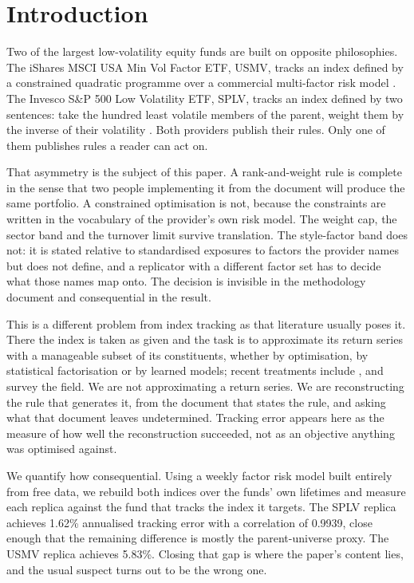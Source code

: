 \section{Introduction}
\label{sec:intro}
Two of the largest low-volatility equity funds are built on opposite
philosophies. The iShares MSCI USA Min Vol Factor ETF, USMV, tracks an index
defined by a constrained quadratic programme over a commercial multi-factor
risk model \citep{ishares2011usmv497k}. The Invesco S\&P 500 Low Volatility
ETF, SPLV, tracks an index defined by two sentences: take the hundred least
volatile members of the parent, weight them by the inverse of their volatility
\citep{invesco2024splv497k}. Both providers publish their rules. Only one of
them publishes rules a reader can act on.

That asymmetry is the subject of this paper. A rank-and-weight rule is complete
in the sense that two people implementing it from the document will produce the
same portfolio. A constrained optimisation is not, because the constraints are
written in the vocabulary of the provider's own risk model. The weight cap,
the sector band and the turnover limit survive translation. The style-factor
band does not: it is stated relative to standardised exposures to factors the
provider names but does not define, and a replicator with a different factor
set has to decide what those names map onto. The decision is invisible in the
methodology document and consequential in the result.

This is a different problem from index tracking as that literature usually
poses it. There the index is taken as given and the task is to approximate its
return series with a manageable subset of its constituents, whether by
optimisation, by statistical factorisation or by learned models; recent
treatments include \citet{cesarone2025benchmark}, and \citet{dhingra2026index}
survey the field. We are not approximating a return series. We are
reconstructing the rule that generates it, from the document that states the
rule, and asking what that document leaves undetermined. Tracking error appears
here as the measure of how well the reconstruction succeeded, not as an
objective anything was optimised against.

We quantify how consequential. Using a weekly factor risk model built entirely
from free data, we rebuild both indices over the funds' own lifetimes and
measure each replica against the fund that tracks the index it targets. The
SPLV replica achieves 1.62\% annualised tracking error with a correlation of
0.9939, close enough that the remaining difference is mostly the
parent-universe proxy. The USMV replica achieves 5.83\%. Closing that gap is
where the paper's content lies, and the usual suspect turns out to be the wrong
one.

